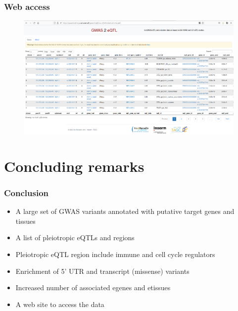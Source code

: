 \documentclass{beamer}
\begin{document}
    \begin{frame}
        \frametitle{Web access}


        \begin{figure}[!]
            \includegraphics[width=\textwidth]{fig/web_portal.png}\label{fig:coloc_web}
        \end{figure}

    \end{frame}

    \section{Concluding remarks} %

    \begin{frame}
        \frametitle{Conclusion}

        \begin{itemize}
            \item A large set of GWAS variants annotated with putative target genes and tissues
            \item A list of pleiotropic eQTLs and regions
            \item Pleiotropic eQTL region include immune and cell cycle regulators
            \item Enrichment of 5' UTR and transcript (missense) variants
            \item Increased number of associated egenes and etissues
            \item A web site to access the data
        \end{itemize}

    \end{frame}
\end{document}
